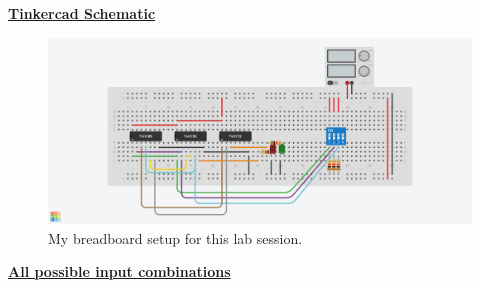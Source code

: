 \documentclass[a4paper]{article}
\begin{document}
\newpage
{}
\vspace*{\fill}
\begin{center}
  {\Huge\textbf{\underline{Tinkercad Schematic}}}
\end{center}
\vspace*{\fill}
\newpage
{}
\vspace*{\fill}
\begin{figure}[h]
  \centering
  \includegraphics[width=1\textwidth, scale=2]{schematic.png}
  \caption*{My breadboard setup for this lab session.}
  \label{fig:schem}
\end{figure}
\vspace*{\fill}
\newpage
{}
\vspace*{\fill}
\begin{center}
  {\Huge\textbf{\underline{All possible input combinations}}}
\end{center}
\vspace*{\fill}
\newpage
\end{document}
